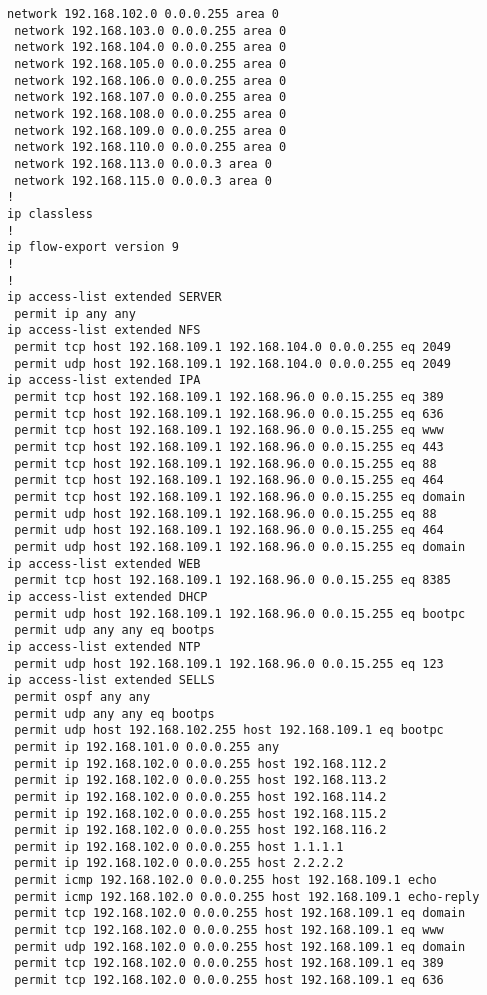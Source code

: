 \documentclass[14pt, a4paper]{extarticle}
\begin{document}
\begin{appendices}
\begin{lstlisting}[caption=Конфигурация устройства SW\_2\_L3\_IVANOV\label{list:conf_sw2_l3}]
 network 192.168.102.0 0.0.0.255 area 0
 network 192.168.103.0 0.0.0.255 area 0
 network 192.168.104.0 0.0.0.255 area 0
 network 192.168.105.0 0.0.0.255 area 0
 network 192.168.106.0 0.0.0.255 area 0
 network 192.168.107.0 0.0.0.255 area 0
 network 192.168.108.0 0.0.0.255 area 0
 network 192.168.109.0 0.0.0.255 area 0
 network 192.168.110.0 0.0.0.255 area 0
 network 192.168.113.0 0.0.0.3 area 0
 network 192.168.115.0 0.0.0.3 area 0
!
ip classless
!
ip flow-export version 9
!
!
ip access-list extended SERVER
 permit ip any any
ip access-list extended NFS
 permit tcp host 192.168.109.1 192.168.104.0 0.0.0.255 eq 2049
 permit udp host 192.168.109.1 192.168.104.0 0.0.0.255 eq 2049
ip access-list extended IPA
 permit tcp host 192.168.109.1 192.168.96.0 0.0.15.255 eq 389
 permit tcp host 192.168.109.1 192.168.96.0 0.0.15.255 eq 636
 permit tcp host 192.168.109.1 192.168.96.0 0.0.15.255 eq www
 permit tcp host 192.168.109.1 192.168.96.0 0.0.15.255 eq 443
 permit tcp host 192.168.109.1 192.168.96.0 0.0.15.255 eq 88
 permit tcp host 192.168.109.1 192.168.96.0 0.0.15.255 eq 464
 permit tcp host 192.168.109.1 192.168.96.0 0.0.15.255 eq domain
 permit udp host 192.168.109.1 192.168.96.0 0.0.15.255 eq 88
 permit udp host 192.168.109.1 192.168.96.0 0.0.15.255 eq 464
 permit udp host 192.168.109.1 192.168.96.0 0.0.15.255 eq domain
ip access-list extended WEB
 permit tcp host 192.168.109.1 192.168.96.0 0.0.15.255 eq 8385
ip access-list extended DHCP
 permit udp host 192.168.109.1 192.168.96.0 0.0.15.255 eq bootpc
 permit udp any any eq bootps
ip access-list extended NTP
 permit udp host 192.168.109.1 192.168.96.0 0.0.15.255 eq 123
ip access-list extended SELLS
 permit ospf any any
 permit udp any any eq bootps
 permit udp host 192.168.102.255 host 192.168.109.1 eq bootpc
 permit ip 192.168.101.0 0.0.0.255 any
 permit ip 192.168.102.0 0.0.0.255 host 192.168.112.2
 permit ip 192.168.102.0 0.0.0.255 host 192.168.113.2
 permit ip 192.168.102.0 0.0.0.255 host 192.168.114.2
 permit ip 192.168.102.0 0.0.0.255 host 192.168.115.2
 permit ip 192.168.102.0 0.0.0.255 host 192.168.116.2
 permit ip 192.168.102.0 0.0.0.255 host 1.1.1.1
 permit ip 192.168.102.0 0.0.0.255 host 2.2.2.2
 permit icmp 192.168.102.0 0.0.0.255 host 192.168.109.1 echo
 permit icmp 192.168.102.0 0.0.0.255 host 192.168.109.1 echo-reply
 permit tcp 192.168.102.0 0.0.0.255 host 192.168.109.1 eq domain
 permit tcp 192.168.102.0 0.0.0.255 host 192.168.109.1 eq www
 permit udp 192.168.102.0 0.0.0.255 host 192.168.109.1 eq domain
 permit tcp 192.168.102.0 0.0.0.255 host 192.168.109.1 eq 389
 permit tcp 192.168.102.0 0.0.0.255 host 192.168.109.1 eq 636

\end{lstlisting}
\end{appendices}
\end{document}
